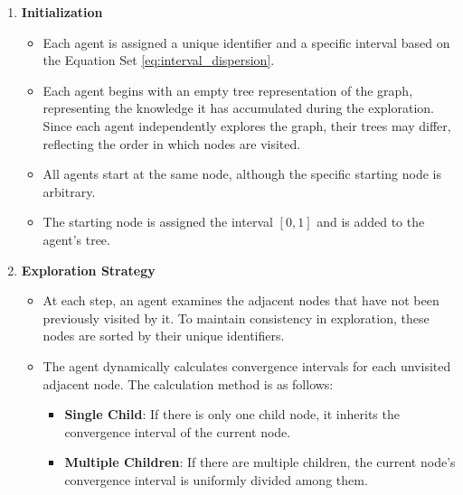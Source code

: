 \begin{enumerate}
    \item \textbf{Initialization}
    \begin{itemize}
        \item Each agent is assigned a unique identifier and a specific interval based on the Equation Set \ref{eq:interval_dispersion}.
        \item Each agent begins with an empty tree representation of the graph, representing the knowledge it has accumulated during the exploration. Since each agent independently explores the graph, their trees may differ, reflecting the order in which nodes are visited.
        \item All agents start at the same node, although the specific starting node is arbitrary.
        \item The starting node is assigned the interval $[0,1]$ and is added to the agent's tree.
    \end{itemize}
    \item \textbf{Exploration Strategy}
    \begin{itemize}
        \item At each step, an agent examines the adjacent nodes that have not been previously visited by it. To maintain consistency in exploration, these nodes are sorted by their unique identifiers.
        \item The agent dynamically calculates convergence intervals for each unvisited adjacent node. The calculation method is as follows:
        \begin{itemize}

            \item \textbf{Single Child}: If there is only one child node, it inherits the convergence interval of the current node.
            
            \item \textbf{Multiple Children}: If there are multiple children, the current node's convergence interval is uniformly divided among them.
            

\end{itemize}
\end{itemize}
\end{enumerate}
